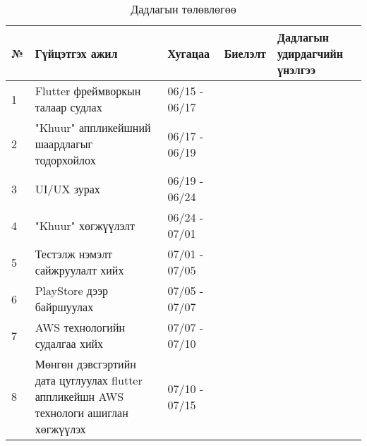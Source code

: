 \begin{table}[h]
\caption{Дадлагын төлөвлөгөө}
\begin{tabular}{|p{0.5cm}|p{8cm}|l|l|p{3cm}|}
\hline
\textbf{№} & \textbf{Гүйцэтгэх ажил} & \textbf{Хугацаа} & \textbf{Биелэлт} & \textbf{Дадлагын удирдагчийн үнэлгээ} \\ \hline
1 & Flutter фреймворкын талаар судлах & 06/15 - 06/17 && \\ \hline
2 & "Khuur" аппликейшний шаардлагыг тодорхойлох & 06/17 - 06/19 && \\ \hline
3 & UI/UX зурах& 06/19 - 06/24 && \\ \hline
4 & "Khuur" хөгжүүлэлт & 06/24 - 07/01 && \\ \hline
5 & Тестэлж нэмэлт сайжруулалт хийх& 07/01 - 07/05 && \\ \hline
6 & PlayStore дээр байршуулах & 07/05 - 07/07 && \\ \hline
7 & AWS технологийн судалгаа хийх & 07/07 - 07/10 && \\ \hline
8 & Мөнгөн дэвсгэртийн дата цуглуулах flutter аппликейшн AWS технологи ашиглан хөгжүүлэх & 07/10 - 07/15 &&  \\ \hline
\end{tabular}
\end{table}